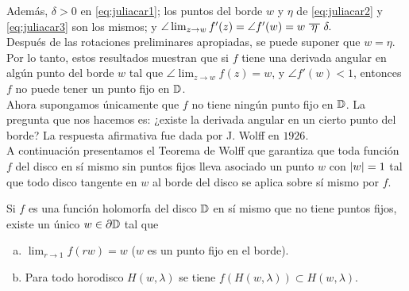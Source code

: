 Además, $\delta > 0$ en \eqref{eq:juliacar1}; los puntos del borde $w$ y $\eta$ de \eqref{eq:juliacar2} y \eqref{eq:juliacar3} son los mismos; y $\angle \lim_{z \to w} f'(z) = \angle f'(w) = w \xbar{\eta} \delta.$ \\

Después de las rotaciones preliminares apropiadas, se puede suponer que $w = \eta$. Por lo tanto, estos resultados muestran que si $f$ tiene una derivada angular en algún punto del borde $w$ tal que $\angle \lim_{z \to w} f(z) = w$, y $\angle f'(w) < 1$, entonces $ f $ no puede tener un punto fijo en $\mathbb{D}$. \\

Ahora supongamos únicamente que $f$ no tiene ningún punto fijo en $\mathbb{D}$. La pregunta que nos hacemos es: ¿existe la derivada angular en un cierto punto del borde? La respuesta afirmativa fue dada por J. Wolff en $1926$. \\

A continuación presentamos el Teorema de Wolff que garantiza que toda función $f$ del disco en sí mismo sin puntos fijos lleva asociado un punto $w$ con $\left\lvert w\right\rvert = 1$ tal que todo disco tangente en $w$ al borde del disco se aplica sobre sí mismo por $f$. \\

\begin{theorem}[de Wolff]
    Si $f$ es una función holomorfa del disco $\mathbb{D}$ en sí mismo que no tiene puntos fijos, existe un único $w \in \partial \mathbb{D}$ tal que
    \begin{enumerate}[a)]
        \item $\lim_{r \to 1} f(rw) = w$ ($w$ es un punto fijo en el borde).
        \item Para todo horodisco $H(w, \lambda)$ se tiene $f(H(w, \lambda)) \subset  H(w, \lambda)$.
    \end{enumerate}
\end{theorem}

